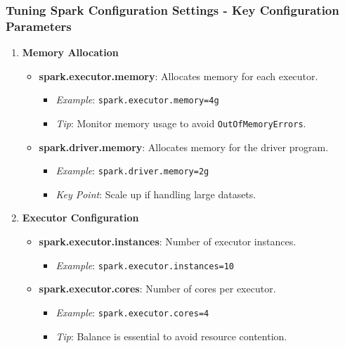 \documentclass[aspectratio=169]{beamer}
\begin{document}
\begin{frame}[fragile]
    \frametitle{Tuning Spark Configuration Settings - Key Configuration Parameters}
    \begin{enumerate}
        \item \textbf{Memory Allocation}
            \begin{itemize}
                \item \textbf{spark.executor.memory}: Allocates memory for each executor.
                    \begin{itemize}
                        \item \textit{Example}: \texttt{spark.executor.memory=4g}
                        \item \textit{Tip}: Monitor memory usage to avoid \texttt{OutOfMemoryErrors}.
                    \end{itemize}
                \item \textbf{spark.driver.memory}: Allocates memory for the driver program.
                    \begin{itemize}
                        \item \textit{Example}: \texttt{spark.driver.memory=2g}
                        \item \textit{Key Point}: Scale up if handling large datasets.
                    \end{itemize}
            \end{itemize}
        
        \item \textbf{Executor Configuration}
            \begin{itemize}
                \item \textbf{spark.executor.instances}: Number of executor instances.
                    \begin{itemize}
                        \item \textit{Example}: \texttt{spark.executor.instances=10}
                    \end{itemize}
                \item \textbf{spark.executor.cores}: Number of cores per executor.
                    \begin{itemize}
                        \item \textit{Example}: \texttt{spark.executor.cores=4}
                        \item \textit{Tip}: Balance is essential to avoid resource contention.
                    \end{itemize}
            \end{itemize}
    \end{enumerate}
\end{frame}
\end{document}
